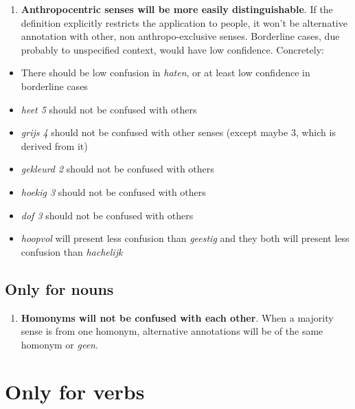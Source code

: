 \documentclass[
]{book}
\providecommand{\tightlist}{%
  \setlength{\itemsep}{0pt}\setlength{\parskip}{0pt}}
\begin{document}
\begin{enumerate}
\def\labelenumi{\arabic{enumi}.}
\setcounter{enumi}{2}
\tightlist
\item
  \textbf{Anthropocentric senses will be more easily distinguishable}.
  If the definition explicitly restricts the application to people, it won't be alternative annotation with other, non anthropo-exclusive senses. Borderline cases, due probably to unspecified context, would have low confidence.
  Concretely:
\end{enumerate}

\begin{itemize}
\tightlist
\item
  There should be low confusion in \emph{haten}, or at least low confidence in borderline cases
\item
  \emph{heet 5} should not be confused with others
\item
  \emph{grijs 4} should not be confused with other senses (except maybe 3, which is derived from it)
\item
  \emph{gekleurd 2} should not be confused with others
\item
  \emph{hoekig 3} should not be confused with others
\item
  \emph{dof 3} should not be confused with others
\item
  \emph{hoopvol} will present less confusion than \emph{geestig} and they both will present less confusion than \emph{hachelijk}
\end{itemize}

\hypertarget{only-for-nouns}{%
\subsection{Only for nouns}\label{only-for-nouns}}

\begin{enumerate}
\def\labelenumi{\arabic{enumi}.}
\setcounter{enumi}{3}
\tightlist
\item
  \textbf{Homonyms will not be confused with each other}.
  When a majority sense is from one homonym, alternative annotations will be of the same homonym or \emph{geen}.
\end{enumerate}

\hypertarget{only-for-verbs}{%
\section{Only for verbs}\label{only-for-verbs}}
\end{document}
